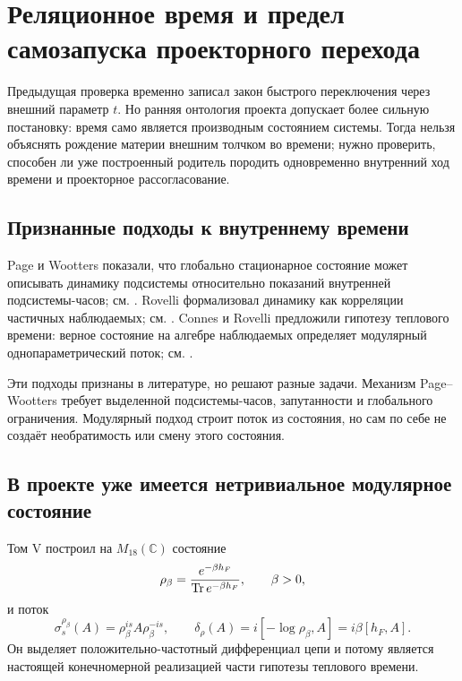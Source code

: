 \chapter{Реляционное время и предел самозапуска проекторного перехода}

Предыдущая проверка временно записал закон быстрого переключения через внешний параметр $t$.
Но ранняя онтология проекта допускает более сильную постановку: время само
является производным состоянием системы. Тогда нельзя объяснять рождение
материи внешним толчком во времени; нужно проверить, способен ли уже
построенный родитель породить одновременно внутренний ход времени и
проекторное рассогласование.

\section{Признанные подходы к внутреннему времени}

Page и Wootters показали, что глобально стационарное состояние может
описывать динамику подсистемы относительно показаний внутренней
подсистемы-часов; см. . Rovelli
формализовал динамику как корреляции частичных наблюдаемых; см.
. Connes и Rovelli предложили гипотезу теплового
времени: верное состояние на алгебре наблюдаемых определяет модулярный
однопараметрический поток; см. .

Эти подходы признаны в литературе, но решают разные задачи. Механизм
Page--Wootters требует выделенной подсистемы-часов, запутанности и
глобального ограничения. Модулярный подход строит поток из состояния, но
сам по себе не создаёт необратимость или смену этого состояния.

\section{В проекте уже имеется нетривиальное модулярное состояние}

Том V построил на $M_{18}(\mathbb C)$ состояние
\begin{equation}
 \rho_\beta=\frac{e^{-\beta h_F}}{\operatorname{Tr} e^{-\beta h_F}},
 \qquad \beta>0,
 \label{eq:v6-existing-modular-state}
\end{equation}
и поток
\begin{equation}
 \sigma_s^{\rho_\beta}(A)
 =\rho_\beta^{is}A\rho_\beta^{-is},
 \qquad
 \delta_\rho(A)=i[-\log\rho_\beta,A]
 =i\beta[h_F,A].
 \label{eq:v6-existing-modular-flow}
\end{equation}
Он выделяет положительно-частотный дифференциал цепи и потому является
настоящей конечномерной реализацией части гипотезы теплового времени.

